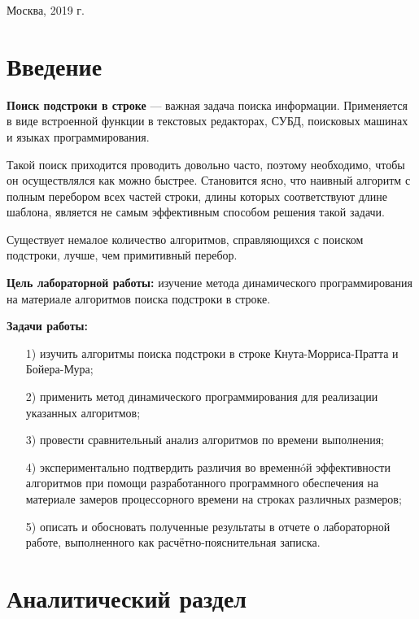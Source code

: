 \documentclass[a4paper,12pt]{article}
\begin{document}
\vspace*{40mm}
\begin{center}
Москва, 2019 г.  
\end{center}
\thispagestyle{empty}

\tableofcontents

\section*{Введение}

\textbf{Поиск подстроки в строке} --- важная задача поиска информации.
Применяется в виде встроенной функции в текстовых редакторах, СУБД,
поисковых машинах и языках программирования.

Такой поиск приходится проводить довольно часто, поэтому необходимо, чтобы
он осуществлялся как можно быстрее. Становится ясно, что наивный алгоритм с
полным перебором всех частей строки, длины которых соответствуют
длине шаблона, является не самым эффективным способом решения такой задачи.

Существует немалое количество алгоритмов, справляющихся с поиском подстроки,
лучше, чем примитивный перебор. 

\textbf{Цель лабораторной работы:} изучение метода динамического программирования
на материале алгоритмов поиска подстроки в строке.

\textbf{Задачи работы:}
	
\begin{enumerate} 
\item[1)] изучить алгоритмы поиска подстроки в строке Кнута-Морриса-Пратта
и Бойера-Мура;
\item[2)] применить метод динамического программирования для  
реализации указанных алгоритмов;
\item[3)] провести сравнительный анализ алгоритмов по времени выполнения;
\item[4)] экспериментально подтвердить различия во временнóй эффективности алгоритмов 
при помощи разработанного программного обеспечения на материале замеров процессорного 
времени на строках различных размеров;
\item[5)] описать и обосновать полученные результаты в отчете о лабораторной 
работе, выполненного как расчётно-пояснительная записка. 
\end{enumerate} 
\pagebreak

\newpage
\section{Аналитический раздел}
	
\end{document}
